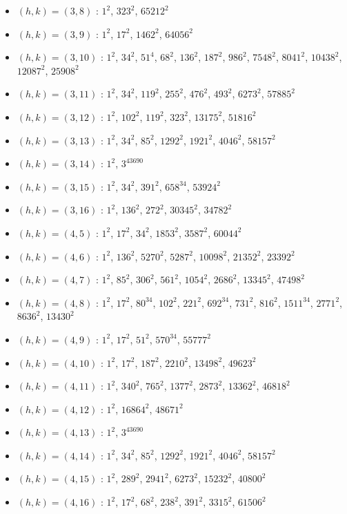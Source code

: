 \begin{itemize}
\item $(h,k)=(3,8)$ : $1^{2}$, $323^{2}$, $65212^{2}$
\item $(h,k)=(3,9)$ : $1^{2}$, $17^{2}$, $1462^{2}$, $64056^{2}$
\item $(h,k)=(3,10)$ : $1^{2}$, $34^{2}$, $51^{4}$, $68^{2}$, $136^{2}$, $187^{2}$, $986^{2}$, $7548^{2}$, $8041^{2}$, $10438^{2}$, $12087^{2}$, $25908^{2}$
\item $(h,k)=(3,11)$ : $1^{2}$, $34^{2}$, $119^{2}$, $255^{2}$, $476^{2}$, $493^{2}$, $6273^{2}$, $57885^{2}$
\item $(h,k)=(3,12)$ : $1^{2}$, $102^{2}$, $119^{2}$, $323^{2}$, $13175^{2}$, $51816^{2}$
\item $(h,k)=(3,13)$ : $1^{2}$, $34^{2}$, $85^{2}$, $1292^{2}$, $1921^{2}$, $4046^{2}$, $58157^{2}$
\item $(h,k)=(3,14)$ : $1^{2}$, $3^{43690}$
\item $(h,k)=(3,15)$ : $1^{2}$, $34^{2}$, $391^{2}$, $658^{34}$, $53924^{2}$
\item $(h,k)=(3,16)$ : $1^{2}$, $136^{2}$, $272^{2}$, $30345^{2}$, $34782^{2}$
\item $(h,k)=(4,5)$ : $1^{2}$, $17^{2}$, $34^{2}$, $1853^{2}$, $3587^{2}$, $60044^{2}$
\item $(h,k)=(4,6)$ : $1^{2}$, $136^{2}$, $5270^{2}$, $5287^{2}$, $10098^{2}$, $21352^{2}$, $23392^{2}$
\item $(h,k)=(4,7)$ : $1^{2}$, $85^{2}$, $306^{2}$, $561^{2}$, $1054^{2}$, $2686^{2}$, $13345^{2}$, $47498^{2}$
\item $(h,k)=(4,8)$ : $1^{2}$, $17^{2}$, $80^{34}$, $102^{2}$, $221^{2}$, $692^{34}$, $731^{2}$, $816^{2}$, $1511^{34}$, $2771^{2}$, $8636^{2}$, $13430^{2}$
\item $(h,k)=(4,9)$ : $1^{2}$, $17^{2}$, $51^{2}$, $570^{34}$, $55777^{2}$
\item $(h,k)=(4,10)$ : $1^{2}$, $17^{2}$, $187^{2}$, $2210^{2}$, $13498^{2}$, $49623^{2}$
\item $(h,k)=(4,11)$ : $1^{2}$, $340^{2}$, $765^{2}$, $1377^{2}$, $2873^{2}$, $13362^{2}$, $46818^{2}$
\item $(h,k)=(4,12)$ : $1^{2}$, $16864^{2}$, $48671^{2}$
\item $(h,k)=(4,13)$ : $1^{2}$, $3^{43690}$
\item $(h,k)=(4,14)$ : $1^{2}$, $34^{2}$, $85^{2}$, $1292^{2}$, $1921^{2}$, $4046^{2}$, $58157^{2}$
\item $(h,k)=(4,15)$ : $1^{2}$, $289^{2}$, $2941^{2}$, $6273^{2}$, $15232^{2}$, $40800^{2}$
\item $(h,k)=(4,16)$ : $1^{2}$, $17^{2}$, $68^{2}$, $238^{2}$, $391^{2}$, $3315^{2}$, $61506^{2}$

\end{itemize}
